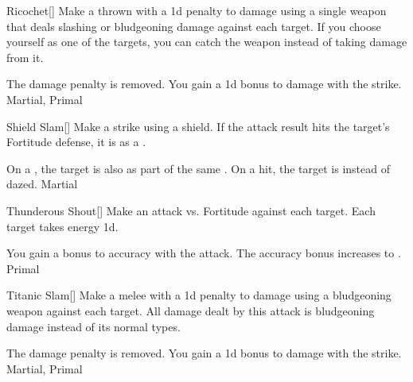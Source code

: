 \lowercase{\hypertarget{maneuver:Ricochet}{}}\label{maneuver:Ricochet}
\hypertarget{maneuver:Ricochet}{}
\begin{freeability}[Rank 3]{Ricochet}[]
Make a thrown  with a \minus1d penalty to damage using a single weapon that deals slashing or bludgeoning damage against each target.
If you choose yourself as one of the targets, you can catch the weapon instead of taking damage from it.

\rankline
{} The damage penalty is removed.
 You gain a \plus1d bonus to damage with the strike.
 Martial, Primal
\end{freeability}
\vspace{0.25em}



\lowercase{\hypertarget{maneuver:Shield Slam}{}}\label{maneuver:Shield Slam}
\hypertarget{maneuver:Shield Slam}{}
\begin{freeability}[Rank 3]{Shield Slam}[]
Make a strike using a shield.
If the attack result hits the target's Fortitude defense,
it is  as a .

\rankline
{} On a , the target is also  as part of the same .
 On a hit, the target is  instead of dazed.
 Martial
\end{freeability}
\vspace{0.25em}



\lowercase{\hypertarget{maneuver:Thunderous Shout}{}}\label{maneuver:Thunderous Shout}
\hypertarget{maneuver:Thunderous Shout}{}
\begin{freeability}[Rank 3]{Thunderous Shout}[]
Make an attack vs. Fortitude against each target.
\hit Each target takes energy  \minus1d.

\rankline
{} You gain a  bonus to accuracy with the attack.
 The accuracy bonus increases to .
 Primal
\end{freeability}
\vspace{0.25em}



\lowercase{\hypertarget{maneuver:Titanic Slam}{}}\label{maneuver:Titanic Slam}
\hypertarget{maneuver:Titanic Slam}{}
\begin{freeability}[Rank 3]{Titanic Slam}[]
Make a melee  with a \minus1d penalty to damage using a bludgeoning weapon against each target.
All damage dealt by this attack is bludgeoning damage instead of its normal types.

\rankline
{} The damage penalty is removed.
 You gain a \plus1d bonus to damage with the strike.
 Martial, Primal
\end{freeability}
\vspace{0.25em}



